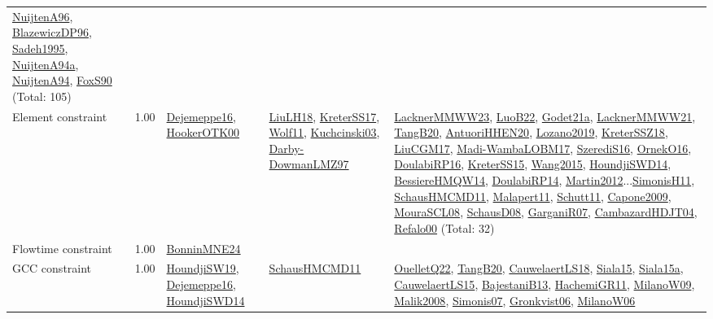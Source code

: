 {\begin{longtable}{p{3cm}r>{\raggedright\arraybackslash}p{6cm}>{\raggedright\arraybackslash}p{6cm}>{\raggedright\arraybackslash}p{8cm}}
\hyperref[detail:NuijtenA96]{NuijtenA96}, \hyperref[detail:BlazewiczDP96]{BlazewiczDP96}, \hyperref[detail:Sadeh1995]{Sadeh1995}, \hyperref[detail:NuijtenA94a]{NuijtenA94a}, \hyperref[detail:NuijtenA94]{NuijtenA94}, \hyperref[detail:FoxS90]{FoxS90} (Total: 105)\\
\index{Element constraint}\index{Constraints!Element constraint}Element constraint &  1.00 & \hyperref[detail:Dejemeppe16]{Dejemeppe16}, \hyperref[detail:HookerOTK00]{HookerOTK00} & \hyperref[detail:LiuLH18]{LiuLH18}, \hyperref[detail:KreterSS17]{KreterSS17}, \hyperref[detail:Wolf11]{Wolf11}, \hyperref[detail:Kuchcinski03]{Kuchcinski03}, \hyperref[detail:Darby-DowmanLMZ97]{Darby-DowmanLMZ97} & \hyperref[detail:LacknerMMWW23]{LacknerMMWW23}, \hyperref[detail:LuoB22]{LuoB22}, \hyperref[detail:Godet21a]{Godet21a}, \hyperref[detail:LacknerMMWW21]{LacknerMMWW21}, \hyperref[detail:TangB20]{TangB20}, \hyperref[detail:AntuoriHHEN20]{AntuoriHHEN20}, \hyperref[detail:Lozano2019]{Lozano2019}, \hyperref[detail:KreterSSZ18]{KreterSSZ18}, \hyperref[detail:LiuCGM17]{LiuCGM17}, \hyperref[detail:Madi-WambaLOBM17]{Madi-WambaLOBM17}, \hyperref[detail:SzerediS16]{SzerediS16}, \hyperref[detail:OrnekO16]{OrnekO16}, \hyperref[detail:DoulabiRP16]{DoulabiRP16}, \hyperref[detail:KreterSS15]{KreterSS15}, \hyperref[detail:Wang2015]{Wang2015}, \hyperref[detail:HoundjiSWD14]{HoundjiSWD14}, \hyperref[detail:BessiereHMQW14]{BessiereHMQW14}, \hyperref[detail:DoulabiRP14]{DoulabiRP14}, \hyperref[detail:Martin2012]{Martin2012}...\hyperref[detail:SimonisH11]{SimonisH11}, \hyperref[detail:SchausHMCMD11]{SchausHMCMD11}, \hyperref[detail:Malapert11]{Malapert11}, \hyperref[detail:Schutt11]{Schutt11}, \hyperref[detail:Capone2009]{Capone2009}, \hyperref[detail:MouraSCL08]{MouraSCL08}, \hyperref[detail:SchausD08]{SchausD08}, \hyperref[detail:GarganiR07]{GarganiR07}, \hyperref[detail:CambazardHDJT04]{CambazardHDJT04}, \hyperref[detail:Refalo00]{Refalo00} (Total: 32)\\
\index{Flowtime constraint}\index{Constraints!Flowtime constraint}Flowtime constraint &  1.00 & \hyperref[detail:BonninMNE24]{BonninMNE24} &  & \\
\index{GCC constraint}\index{Constraints!GCC constraint}GCC constraint &  1.00 & \hyperref[detail:HoundjiSW19]{HoundjiSW19}, \hyperref[detail:Dejemeppe16]{Dejemeppe16}, \hyperref[detail:HoundjiSWD14]{HoundjiSWD14} & \hyperref[detail:SchausHMCMD11]{SchausHMCMD11} & \hyperref[detail:OuelletQ22]{OuelletQ22}, \hyperref[detail:TangB20]{TangB20}, \hyperref[detail:CauwelaertLS18]{CauwelaertLS18}, \hyperref[detail:Siala15]{Siala15}, \hyperref[detail:Siala15a]{Siala15a}, \hyperref[detail:CauwelaertLS15]{CauwelaertLS15}, \hyperref[detail:BajestaniB13]{BajestaniB13}, \hyperref[detail:HachemiGR11]{HachemiGR11}, \hyperref[detail:MilanoW09]{MilanoW09}, \hyperref[detail:Malik2008]{Malik2008}, \hyperref[detail:Simonis07]{Simonis07}, \hyperref[detail:Gronkvist06]{Gronkvist06}, \hyperref[detail:MilanoW06]{MilanoW06}\\

\end{longtable}}
